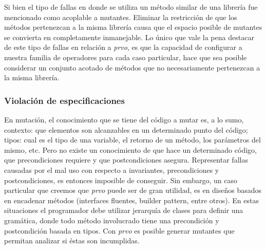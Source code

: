 Si bien el tipo de fallas en donde se utiliza un m\'etodo similar de una librer\'ia fue mencionado como acoplable a mutantes. Eliminar la restricci\'on de que los m\'etodos pertenezcan a la misma librer\'ia causa que el espacio posible de mutantes se convierta en completamente inmanejable. Lo \'unico que vale la pena destacar de este tipo de fallas en relaci\'on a \emph{prvo}, es que la capacidad de configurar a nuestra familia de operadores para cada caso particular, hace que sea posible considerar un conjunto acotado de m\'etodos que no necesariamente pertenezcan a la misma librer\'ia.

\subsubsection{Violaci\'on de especificaciones}

En mutaci\'on, el conocimiento que se tiene del c\'odigo a mutar es, a lo sumo, contexto: que elementos son alcanzables en un determinado punto del c\'odigo; tipos: cual es el tipo de una variable, el retorno de un m\'etodo, los par\'ametros del mismo, etc. Pero no existe un conocimiento de que hace un determinado c\'odigo, que precondiciones requiere y que postcondiciones asegura. Representar fallas causadas por el mal uso con respecto a invariantes, precondiciones y postcondiciones, es entonces imposible de conseguir. Sin embargo, un caso particular que creemos que \emph{prvo} puede ser de gran utilidad, es en dise\~nos basados en encadenar m\'etodos (interfaces fluentes, builder pattern, entre otros). En estas situaciones el programador debe utilizar jerarqu\'ia de clases para definir una gram\'atica, donde todo m\'etodo involucrado tiene una precondici\'on y postcondici\'on basada en tipos. Con \emph{prvo} es posible generar mutantes que permitan analizar si \'estas son incumplidas.

